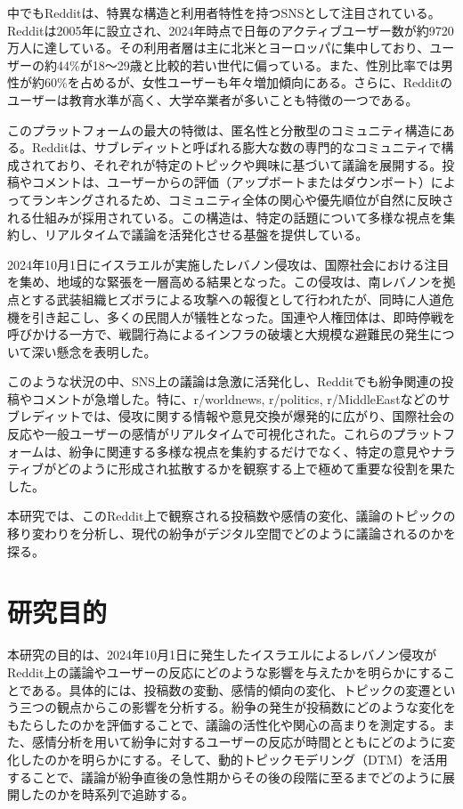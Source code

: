 \documentclass[11pt, a4j]{jreport}
\begin{document}
    中でもRedditは、特異な構造と利用者特性を持つSNSとして注目されている。Redditは2005年に設立され、2024年時点で日毎のアクティブユーザー数が約9720万人に達している\citep{reddit2024third-quarter-results}。その利用者層は主に北米とヨーロッパに集中しており\citep{statista2024reddit-country}、ユーザーの約44\%が18～29歳と比較的若い世代に偏っている\citep{statista2024reddit-age}。また、性別比率では男性が約60\%を占めるが、女性ユーザーも年々増加傾向にある\citep{statista2024reddit-gender}。さらに、Redditのユーザーは教育水準が高く、大学卒業者が多いことも特徴の一つである\citep{pew2024reddit-educated}。

    このプラットフォームの最大の特徴は、匿名性と分散型のコミュニティ構造にある。Redditは、サブレディットと呼ばれる膨大な数の専門的なコミュニティで構成されており、それぞれが特定のトピックや興味に基づいて議論を展開する。投稿やコメントは、ユーザーからの評価（アップボートまたはダウンボート）によってランキングされるため、コミュニティ全体の関心や優先順位が自然に反映される仕組みが採用されている。この構造は、特定の話題について多様な視点を集約し、リアルタイムで議論を活発化させる基盤を提供している。

    2024年10月1日にイスラエルが実施したレバノン侵攻は、国際社会における注目を集め、地域的な緊張を一層高める結果となった。この侵攻は、南レバノンを拠点とする武装組織ヒズボラによる攻撃への報復として行われたが、同時に人道危機を引き起こし、多くの民間人が犠牲となった。国連や人権団体は、即時停戦を呼びかける一方で、戦闘行為によるインフラの破壊と大規模な避難民の発生について深い懸念を表明した。

    このような状況の中、SNS上の議論は急激に活発化し、Redditでも紛争関連の投稿やコメントが急増した。特に、r/worldnews, r/politics, r/MiddleEastなどのサブレディットでは、侵攻に関する情報や意見交換が爆発的に広がり、国際社会の反応や一般ユーザーの感情がリアルタイムで可視化された。これらのプラットフォームは、紛争に関連する多様な視点を集約するだけでなく、特定の意見やナラティブがどのように形成され拡散するかを観察する上で極めて重要な役割を果たした。

    本研究では、このReddit上で観察される投稿数や感情の変化、議論のトピックの移り変わりを分析し、現代の紛争がデジタル空間でどのように議論されるのかを探る。

    \section{研究目的}
    本研究の目的は、2024年10月1日に発生したイスラエルによるレバノン侵攻がReddit上の議論やユーザーの反応にどのような影響を与えたかを明らかにすることである。具体的には、投稿数の変動、感情的傾向の変化、トピックの変遷という三つの観点からこの影響を分析する。紛争の発生が投稿数にどのような変化をもたらしたのかを評価することで、議論の活性化や関心の高まりを測定する。また、感情分析を用いて紛争に対するユーザーの反応が時間とともにどのように変化したのかを明らかにする。そして、動的トピックモデリング（DTM）を活用することで、議論が紛争直後の急性期からその後の段階に至るまでどのように展開したのかを時系列で追跡する。
    
\end{document}
